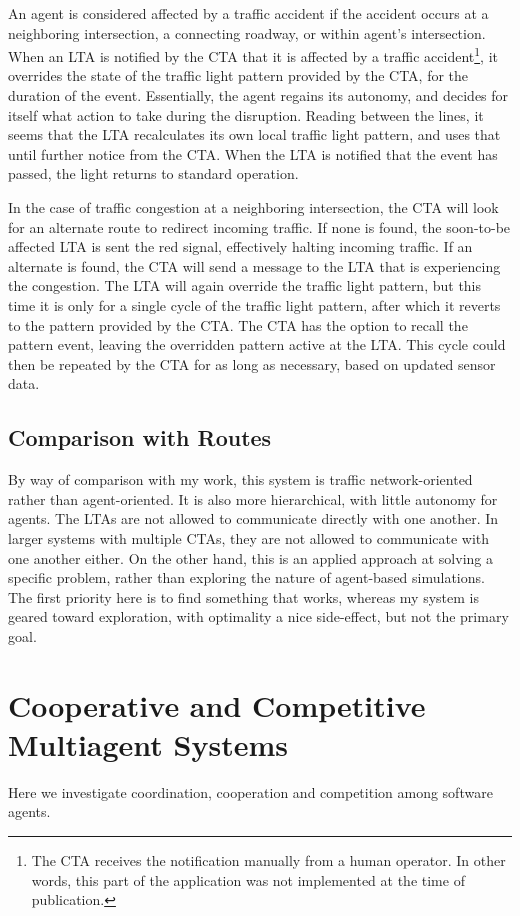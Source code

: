 \documentclass[11pt,letterpaper,onecolumn,twoside,openright,final]{report}
\begin{document}
An agent is considered affected by a traffic accident if the accident occurs at a neighboring intersection, a connecting roadway, or within agent's intersection.
When an LTA is notified by the CTA that it is affected by a traffic accident\footnote{The CTA receives the notification manually from a human operator. In other words, this part of the application was not implemented at the time of publication.}, it overrides the state of the traffic light pattern provided by the CTA, for the duration of the event.
Essentially, the agent regains its autonomy, and decides for itself what action to take during the disruption.
Reading between the lines, it seems that the LTA recalculates its own local traffic light pattern, and uses that until further notice from the CTA.
When the LTA is notified that the event has passed, the light returns to standard operation.

In the case of traffic congestion at a neighboring intersection, the CTA will look for an alternate route to redirect incoming traffic.
If none is found, the soon-to-be affected LTA is sent the red signal, effectively halting incoming traffic.
If an alternate is found, the CTA will send a message to the LTA that is experiencing the congestion.
The LTA will again override the traffic light pattern, but this time it is only for a single cycle of the traffic light pattern, after which it reverts to the pattern provided by the CTA.
The CTA has the option to recall the pattern event, leaving the overridden pattern active at the LTA.
This cycle could then be repeated by the CTA for as long as necessary, based on updated sensor data.

\subsection{Comparison with Routes}
By way of comparison with my work, this system is traffic network-oriented rather than agent-oriented.
It is also more hierarchical, with little autonomy for agents.
The LTAs are not allowed to communicate directly with one another.
In larger systems with multiple CTAs, they are not allowed to communicate with one another either.
On the other hand, this is an applied approach at solving a specific problem, rather than exploring the nature of agent-based simulations.
The first priority here is to find something that works, whereas my system is geared toward exploration, with optimality a nice side-effect, but not the primary goal.

\section[Cooperative and Competitive Agents]{Cooperative and Competitive Multiagent Systems}
Here we investigate coordination, cooperation and competition among software agents.
\end{document}
